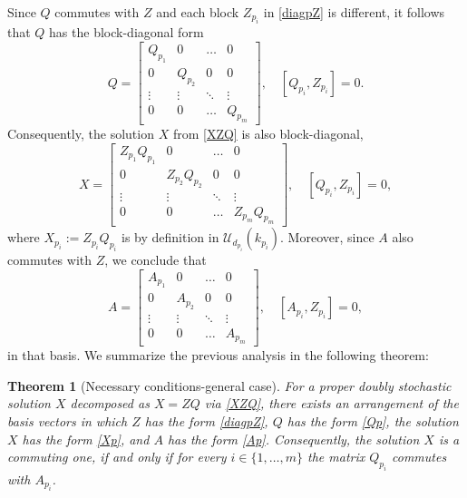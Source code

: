 \documentclass{article}
\newtheorem{theorem}{Theorem}[section]
\theoremstyle{definition}\newtheorem{example}{Example}[section]
\def\U{{\mathcal{U}}}
\begin{document}
Since $Q$ commutes with $Z$ and each block $Z_{p_i}$ in \eqref{diagpZ} is different, it follows that $Q$ has the block-diagonal form
	\begin{equation}
		\label{Qp}
		Q=\left[\begin{array}{cccc}Q_{p_1} &0 & \ldots &0\\
			0& Q_{p_2} &0  & 0\\
			\vdots & \vdots & \ddots & \vdots \\
			0 & 0 & \ldots & Q_{p_m}\end{array}\right],\quad [Q_{p_i},Z_{p_i}]=0.
	\end{equation}  
	Consequently, the solution $X$ from \eqref{XZQ} is also block-diagonal, 
	\begin{equation}
		\label{Xp}
		X=\left[\begin{array}{cccc}
			Z_{p_1}Q_{p_1} &0 & \ldots &0\\
			0& Z_{p_2}Q_{p_2} &0  & 0\\
			\vdots & \vdots & \ddots & \vdots \\
			0 & 0 & \ldots & Z_{p_m}Q_{p_m}\end{array}\right],\quad [Q_{p_i},Z_{p_i}]=0,
	\end{equation} 
	where $X_{p_i}:=Z_{p_i}Q_{p_i}$ is by definition in $\U_{d_{p_i}}(k_{p_i})$. Moreover, since $A$ also commutes with $Z$, we conclude that
	\begin{equation}
		\label{Ap}
		A=\left[\begin{array}{cccc}A_{p_1} &0 & \ldots &0\\
			0& A_{p_2} &0  & 0\\
			\vdots & \vdots & \ddots & \vdots \\
			0 & 0 & \ldots & A_{p_m}\end{array}\right], \quad [A_{p_i},Z_{p_i}]=0,
	\end{equation}
	in that basis. We summarize the previous analysis in the following theorem:
	\begin{theorem}[Necessary conditions-general case]\label{NecesQ} For a proper doubly stochastic solution $X$ decomposed as $X=ZQ$ via \eqref{XZQ}, there exists an arrangement of the basis vectors in which $Z$ has the form \eqref{diagpZ}, $Q$ has the form \eqref{Qp}, the solution $X$ has the form \eqref{Xp}, and $A$ has the form \eqref{Ap}. Consequently, the solution $X$ is a commuting one, if and only if for every $i\in\{1,\ldots,m\}$ the matrix $Q_{p_i}$ commutes with $A_{p_i}$.
	\end{theorem}
	
\end{document}
